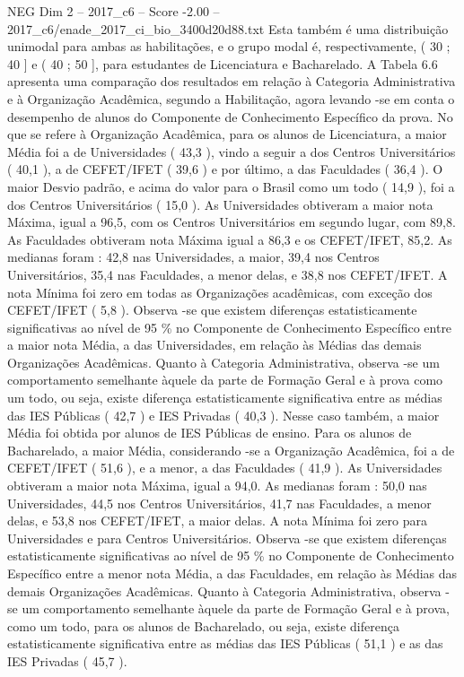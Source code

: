\begin{textsample}{NEG Dim 2 – 2017\_c6 – Score -2.00 – 2017\_c6/enade\_2017\_ci\_bio\_3400d20d88.txt}
Esta também é uma distribuição unimodal para ambas as habilitações, e o grupo modal é, respectivamente, ( 30 ; 40 ] e ( 40 ; 50 ], para estudantes de Licenciatura e Bacharelado.
A Tabela 6.6 apresenta uma comparação dos resultados em relação à Categoria Administrativa e à Organização Acadêmica, segundo a Habilitação, agora levando -se em conta o desempenho de alunos do Componente de Conhecimento Específico da prova.
No que se refere à Organização Acadêmica, para os alunos de Licenciatura, a maior Média foi a de Universidades ( 43,3 ), vindo a seguir a dos Centros Universitários ( 40,1 ), a de CEFET/IFET ( 39,6 ) e por último, a das Faculdades ( 36,4 ).
O maior Desvio padrão, e acima do valor para o Brasil como um todo ( 14,9 ), foi a dos Centros Universitários ( 15,0 ).
As Universidades obtiveram a maior nota Máxima, igual a 96,5, com os Centros Universitários em segundo lugar, com 89,8.
As Faculdades obtiveram nota Máxima igual a 86,3 e os CEFET/IFET, 85,2.
As medianas foram : 42,8 nas Universidades, a maior, 39,4 nos Centros Universitários, 35,4 nas Faculdades, a menor delas, e 38,8 nos CEFET/IFET.
A nota Mínima foi zero em todas as Organizações acadêmicas, com exceção dos CEFET/IFET ( 5,8 ).
Observa -se que existem diferenças estatisticamente significativas ao nível de 95 \% no Componente de Conhecimento Específico entre a maior nota Média, a das Universidades, em relação às Médias das demais Organizações Acadêmicas.
Quanto à Categoria Administrativa, observa -se um comportamento semelhante àquele da parte de Formação Geral e à prova como um todo, ou seja, existe diferença estatisticamente significativa entre as médias das IES Públicas ( 42,7 ) e IES Privadas ( 40,3 ).
Nesse caso também, a maior Média foi obtida por alunos de IES Públicas de ensino.
Para os alunos de Bacharelado, a maior Média, considerando -se a Organização Acadêmica, foi a de CEFET/IFET ( 51,6 ), e a menor, a das Faculdades ( 41,9 ).
As Universidades obtiveram a maior nota Máxima, igual a 94,0.
As medianas foram : 50,0 nas Universidades, 44,5 nos Centros Universitários, 41,7 nas Faculdades, a menor delas, e 53,8 nos CEFET/IFET, a maior delas.
A nota Mínima foi zero para Universidades e para Centros Universitários.
Observa -se que existem diferenças estatisticamente significativas ao nível de 95 \% no Componente de Conhecimento Específico entre a menor nota Média, a das Faculdades, em relação às Médias das demais Organizações Acadêmicas.
Quanto à Categoria Administrativa, observa -se um comportamento semelhante àquele da parte de Formação Geral e à prova, como um todo, para os alunos de Bacharelado, ou seja, existe diferença estatisticamente significativa entre as médias das IES Públicas ( 51,1 ) e as das IES Privadas ( 45,7 ).

\end{textsample}
